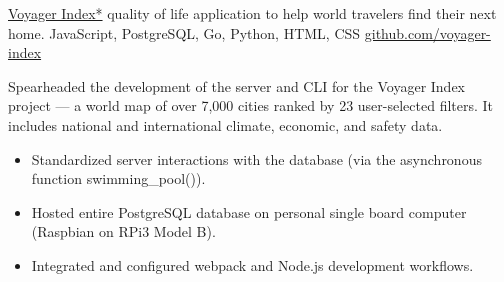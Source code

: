 \showoff
{\textcolor{my-blue}{\href{https://voyager-index.herokuapp.com}{Voyager Index*}}}
{quality of life application to help world travelers find their next home.}
{JavaScript, PostgreSQL, Go, Python, HTML, CSS}
{\textcolor{my-blue}{\href{https://github.com/voyager-index/}{github.com/voyager-index}}}

Spearheaded the development of the server and CLI for the Voyager Index project — a world map of over 7,000 cities ranked by 23 user-selected filters. It includes national and international climate, economic, and safety data.

\begin{itemize}[label=$\triangleright$, itemsep=0, topsep=5px]
\item Standardized server interactions with the database (via the asynchronous function swimming\_pool()).
\item Hosted entire PostgreSQL database on personal single board computer (Raspbian on RPi3 Model B).
\item Integrated and configured webpack and Node.js development workflows.
\end{itemize}

\myBreak
